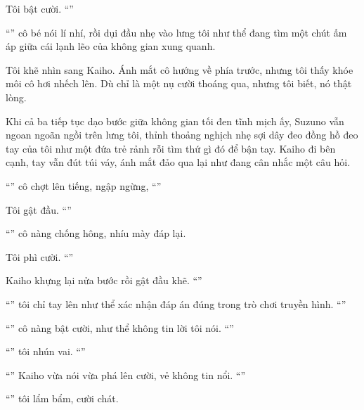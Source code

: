 \documentclass[../main.tex]{subfiles}
\begin{document}
Tôi bật cười. ``''

``'' cô bé nói lí nhí, rồi dụi đầu nhẹ vào lưng tôi như thể đang tìm một chút ấm áp giữa cái lạnh lẽo của không gian xung quanh.

Tôi khẽ nhìn sang Kaiho. Ánh mắt cô hướng về phía trước, nhưng tôi thấy khóe môi cô hơi nhếch lên. Dù chỉ là một nụ cười thoáng qua, nhưng tôi biết, nó thật lòng.

Khi cả ba tiếp tục dạo bước giữa không gian tối đen tĩnh mịch ấy, Suzuno vẫn ngoan ngoãn ngồi trên lưng tôi, thỉnh thoảng nghịch nhẹ sợi dây đeo đồng hồ đeo tay của tôi như một đứa trẻ rảnh rỗi tìm thứ gì đó để bận tay. Kaiho đi bên cạnh, tay vẫn đút túi váy, ánh mắt đảo qua lại như đang cân nhắc một câu hỏi.

``'' cô chợt lên tiếng, ngập ngừng, ``''

Tôi gật đầu. ``''

``'' cô nàng chống hông, nhíu mày đáp lại.

Tôi phì cười. ``''

Kaiho khựng lại nửa bước rồi gật đầu khẽ. ``''

``'' tôi chỉ tay lên như thể xác nhận đáp án đúng trong trò chơi truyền hình. ``''

``'' cô nàng bật cười, như thể không tin lời tôi nói. ``''

``'' tôi nhún vai. ``''

``'' Kaiho vừa nói vừa phá lên cười, vẻ không tin nổi. ``''

``'' tôi lẩm bẩm, cười chát.
\end{document}
